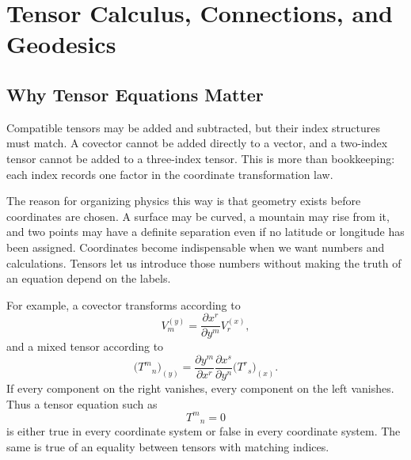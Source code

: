 \chapter{Tensor Calculus, Connections, and Geodesics}


\section{Why Tensor Equations Matter}

Compatible tensors may be added and subtracted, but their index structures
must match. A covector cannot be added directly to a vector, and a
two-index tensor cannot be added to a three-index tensor. This is more than
bookkeeping: each index records one factor in the coordinate
transformation law.

The reason for organizing physics this way is that geometry exists before
coordinates are chosen. A surface may be curved, a mountain may rise from
it, and two points may have a definite separation even if no latitude or
longitude has been assigned. Coordinates become indispensable when we
want numbers and calculations. Tensors let us introduce those numbers
without making the truth of an equation depend on the labels.

For example, a covector transforms according to
\begin{equation}
  V_m^{(y)}
  =
  \frac{\partial x^r}{\partial y^m}V_r^{(x)},
  \label{eq:l05-covector-transform}
\end{equation}
and a mixed tensor according to
\begin{equation}
  \bigl(T^m{}_{n}\bigr)_{(y)}
  =
  \frac{\partial y^m}{\partial x^r}
  \frac{\partial x^s}{\partial y^n}
  \bigl(T^r{}_{s}\bigr)_{(x)}.
  \label{eq:l05-mixed-transform}
\end{equation}
If every component on the right vanishes, every component on the left
vanishes. Thus a tensor equation such as
\begin{equation}
  T^m{}_{n}=0
\end{equation}
is either true in every coordinate system or false in every coordinate
system. The same is true of an equality between tensors with matching
indices.

